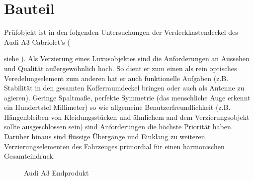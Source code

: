 \documentclass[12pt,a4paper,parskip]{scrartcl}
\begin{document}
\newpage

\section{Bauteil}
Prüfobjekt ist in den folgenden Untersuchungen der Verdeckkastendeckel  des Audi A3 Cabriolet's ({siehe ).
 Als Verzierung eines Luxusobjektes sind die Anforderungen an Aussehen und Qualität außergewöhnlich hoch. So dient er zum einen als rein optisches Veredelungselement zum anderen hat er auch funktionelle Aufgaben (z.B. Stabilität in den gesamten Kofferraumdeckel bringen oder auch als Antenne zu agieren). Geringe Spaltmaße,  perfekte Symmetrie (das menschliche Auge erkennt ein Hundertstel Millimeter) so wie allgemeine Benutzerfreundlichkeit (z.B. Hängenbleiben von Kleidungsstücken und ähnlichem and dem Verzierungsobjekt sollte ausgeschlossen sein) sind Anforderungen die höchste Priorität haben.
 Darüber hinaus sind  flüssige Übergänge und Einklang   zu weiteren Verzierungselementen des Fahrzeuges primordial für einen harmonischen Gesamteindruck.
 
   
\begin{figure}[!htb]
\centering
\hfill
{}
\hspace{2.4cm}
\hfill
\caption[Audi A3 Endprodukt]{Audi A3 Endprodukt\footnotemark }
\label{fig:audia3}
\end{figure}



}
\end{document}

